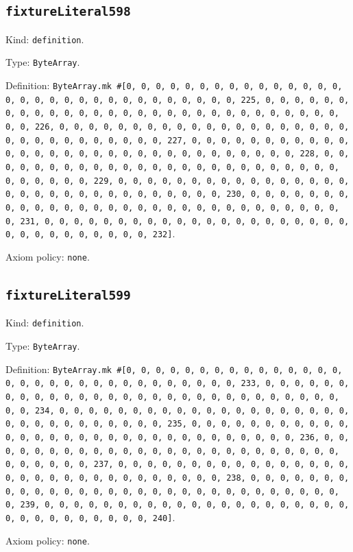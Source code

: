 \documentclass[11pt]{article}
\begin{document}
\subsection*{\texttt{fixtureLiteral598}}
\noindent Kind: \texttt{definition}.\par
\noindent Type: \texttt{ByteArray}.\par
\noindent Definition: \texttt{ByteArray.mk \#[0, 0, 0, 0, 0, 0, 0, 0, 0, 0, 0, 0, 0, 0, 0, 0, 0, 0, 0, 0, 0, 0, 0, 0, 0, 0, 0, 0, 0, 0, 0, 225, 0, 0, 0, 0, 0, 0, 0, 0, 0, 0, 0, 0, 0, 0, 0, 0, 0, 0, 0, 0, 0, 0, 0, 0, 0, 0, 0, 0, 0, 0, 0, 226, 0, 0, 0, 0, 0, 0, 0, 0, 0, 0, 0, 0, 0, 0, 0, 0, 0, 0, 0, 0, 0, 0, 0, 0, 0, 0, 0, 0, 0, 0, 0, 227, 0, 0, 0, 0, 0, 0, 0, 0, 0, 0, 0, 0, 0, 0, 0, 0, 0, 0, 0, 0, 0, 0, 0, 0, 0, 0, 0, 0, 0, 0, 0, 228, 0, 0, 0, 0, 0, 0, 0, 0, 0, 0, 0, 0, 0, 0, 0, 0, 0, 0, 0, 0, 0, 0, 0, 0, 0, 0, 0, 0, 0, 0, 0, 229, 0, 0, 0, 0, 0, 0, 0, 0, 0, 0, 0, 0, 0, 0, 0, 0, 0, 0, 0, 0, 0, 0, 0, 0, 0, 0, 0, 0, 0, 0, 0, 230, 0, 0, 0, 0, 0, 0, 0, 0, 0, 0, 0, 0, 0, 0, 0, 0, 0, 0, 0, 0, 0, 0, 0, 0, 0, 0, 0, 0, 0, 0, 0, 231, 0, 0, 0, 0, 0, 0, 0, 0, 0, 0, 0, 0, 0, 0, 0, 0, 0, 0, 0, 0, 0, 0, 0, 0, 0, 0, 0, 0, 0, 0, 0, 232]}.\par
\noindent Axiom policy: \texttt{none}.\par
\subsection*{\texttt{fixtureLiteral599}}
\noindent Kind: \texttt{definition}.\par
\noindent Type: \texttt{ByteArray}.\par
\noindent Definition: \texttt{ByteArray.mk \#[0, 0, 0, 0, 0, 0, 0, 0, 0, 0, 0, 0, 0, 0, 0, 0, 0, 0, 0, 0, 0, 0, 0, 0, 0, 0, 0, 0, 0, 0, 0, 233, 0, 0, 0, 0, 0, 0, 0, 0, 0, 0, 0, 0, 0, 0, 0, 0, 0, 0, 0, 0, 0, 0, 0, 0, 0, 0, 0, 0, 0, 0, 0, 234, 0, 0, 0, 0, 0, 0, 0, 0, 0, 0, 0, 0, 0, 0, 0, 0, 0, 0, 0, 0, 0, 0, 0, 0, 0, 0, 0, 0, 0, 0, 0, 235, 0, 0, 0, 0, 0, 0, 0, 0, 0, 0, 0, 0, 0, 0, 0, 0, 0, 0, 0, 0, 0, 0, 0, 0, 0, 0, 0, 0, 0, 0, 0, 236, 0, 0, 0, 0, 0, 0, 0, 0, 0, 0, 0, 0, 0, 0, 0, 0, 0, 0, 0, 0, 0, 0, 0, 0, 0, 0, 0, 0, 0, 0, 0, 237, 0, 0, 0, 0, 0, 0, 0, 0, 0, 0, 0, 0, 0, 0, 0, 0, 0, 0, 0, 0, 0, 0, 0, 0, 0, 0, 0, 0, 0, 0, 0, 238, 0, 0, 0, 0, 0, 0, 0, 0, 0, 0, 0, 0, 0, 0, 0, 0, 0, 0, 0, 0, 0, 0, 0, 0, 0, 0, 0, 0, 0, 0, 0, 239, 0, 0, 0, 0, 0, 0, 0, 0, 0, 0, 0, 0, 0, 0, 0, 0, 0, 0, 0, 0, 0, 0, 0, 0, 0, 0, 0, 0, 0, 0, 0, 240]}.\par
\noindent Axiom policy: \texttt{none}.\par
\end{document}

